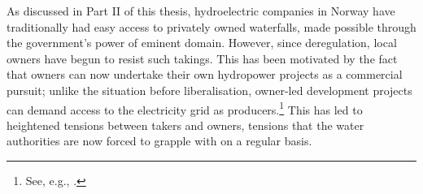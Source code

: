 As discussed in Part II of this thesis, hydroelectric companies in Norway have traditionally had easy access to privately owned waterfalls, made possible through the government's power of eminent domain. However, since deregulation, local owners have begun to resist such takings. This has been motivated by the fact that owners can now undertake their own hydropower projects as a commercial pursuit; unlike the situation before liberalisation, owner-led development projects can demand access to the electricity grid as producers.\footnote{See, e.g., \cite{uleberg08}.} This has led to heightened tensions between takers and owners, tensions that the water authorities are now forced to grapple with on a regular basis.


